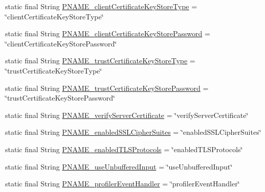 \begin{DoxyCompactItemize}
\item 
static final String \mbox{\hyperlink{classcom_1_1mysql_1_1cj_1_1conf_1_1_property_definitions_a0f95e748247b281ecf5dd431e165ec71}{P\+N\+A\+M\+E\+\_\+client\+Certificate\+Key\+Store\+Type}} = \char`\"{}client\+Certificate\+Key\+Store\+Type\char`\"{}
\item 
static final String \mbox{\hyperlink{classcom_1_1mysql_1_1cj_1_1conf_1_1_property_definitions_ab785e27a41b8e973499d5c8e8752a30d}{P\+N\+A\+M\+E\+\_\+client\+Certificate\+Key\+Store\+Password}} = \char`\"{}client\+Certificate\+Key\+Store\+Password\char`\"{}
\item 
static final String \mbox{\hyperlink{classcom_1_1mysql_1_1cj_1_1conf_1_1_property_definitions_a1f43b71666a5d3055ea4ed0325a418ea}{P\+N\+A\+M\+E\+\_\+trust\+Certificate\+Key\+Store\+Type}} = \char`\"{}trust\+Certificate\+Key\+Store\+Type\char`\"{}
\item 
static final String \mbox{\hyperlink{classcom_1_1mysql_1_1cj_1_1conf_1_1_property_definitions_ad61e9d477ceeb3d8b4bc4b13bd59a0d0}{P\+N\+A\+M\+E\+\_\+trust\+Certificate\+Key\+Store\+Password}} = \char`\"{}trust\+Certificate\+Key\+Store\+Password\char`\"{}
\item 
static final String \mbox{\hyperlink{classcom_1_1mysql_1_1cj_1_1conf_1_1_property_definitions_a633bf1280aa9d9d124072153eedede13}{P\+N\+A\+M\+E\+\_\+verify\+Server\+Certificate}} = \char`\"{}verify\+Server\+Certificate\char`\"{}
\item 
static final String \mbox{\hyperlink{classcom_1_1mysql_1_1cj_1_1conf_1_1_property_definitions_a823931e092bf8043b3b3a8df0fe23672}{P\+N\+A\+M\+E\+\_\+enabled\+S\+S\+L\+Cipher\+Suites}} = \char`\"{}enabled\+S\+S\+L\+Cipher\+Suites\char`\"{}
\item 
static final String \mbox{\hyperlink{classcom_1_1mysql_1_1cj_1_1conf_1_1_property_definitions_adb5306564a1ebfa4f280e667bb312aae}{P\+N\+A\+M\+E\+\_\+enabled\+T\+L\+S\+Protocols}} = \char`\"{}enabled\+T\+L\+S\+Protocols\char`\"{}
\item 
static final String \mbox{\hyperlink{classcom_1_1mysql_1_1cj_1_1conf_1_1_property_definitions_ae5ea77f325e9417b8c2382736867b966}{P\+N\+A\+M\+E\+\_\+use\+Unbuffered\+Input}} = \char`\"{}use\+Unbuffered\+Input\char`\"{}
\item 
static final String \mbox{\hyperlink{classcom_1_1mysql_1_1cj_1_1conf_1_1_property_definitions_a96797d57b285cdeb881430e31330b2a0}{P\+N\+A\+M\+E\+\_\+profiler\+Event\+Handler}} = \char`\"{}profiler\+Event\+Handler\char`\"{}
\item 

\end{DoxyCompactItemize}

